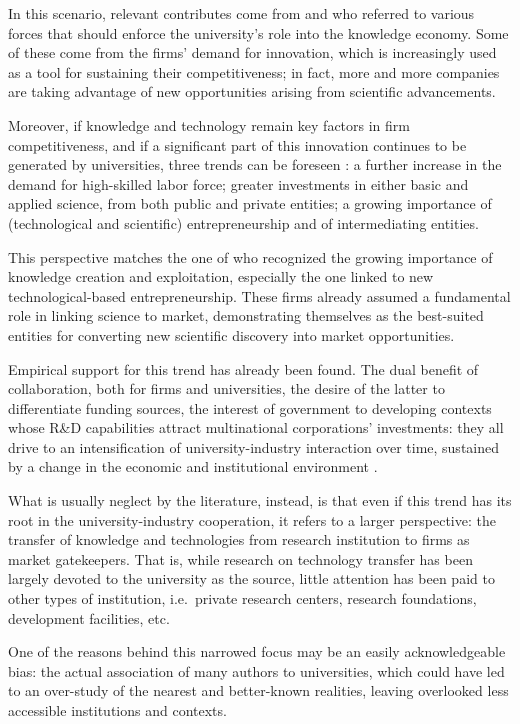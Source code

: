In this scenario, relevant contributes come from \citet{OShea2004} and \citet{Yusuf2008} who referred to various forces that should enforce the university's role into the knowledge economy. Some of these come from the firms' demand for innovation, which is increasingly used as a tool for sustaining their competitiveness; in fact, more and more companies are taking advantage of new opportunities arising from scientific advancements. 

Moreover, if knowledge and technology remain key factors in firm competitiveness, and if a significant part of this innovation continues to be generated by universities, three trends can be foreseen \citep{Yusuf2008}: a further increase in the demand for high-skilled labor force; greater investments in either basic and applied science, from both public and private entities; a growing importance of (technological and scientific) entrepreneurship and of intermediating entities. 

This perspective matches the one of \citet{OShea2004} who recognized the growing importance of knowledge creation and exploitation, especially the one linked to new technological-based entrepreneurship. These firms already assumed a fundamental role in linking science to market, demonstrating themselves as the best-suited entities for converting new scientific discovery into market opportunities. 

Empirical support for this trend has already been found. The dual benefit of collaboration, both for firms and universities, the desire of the latter to differentiate funding sources, the interest of government to developing contexts whose R\&D capabilities attract multinational corporations' investments: they all drive to an intensification of university-industry interaction over time, sustained by a change in the economic and institutional environment \citep{Debackere2005}.

What is usually neglect by the literature, instead, is that even if this trend has its root in the university-industry cooperation, it refers to a larger perspective: the transfer of knowledge and technologies from research institution to firms as market gatekeepers. That is, while research on technology transfer has been largely devoted to the university as the source, little attention has been paid to other types of institution, i.e.\ private research centers, research foundations, development facilities, etc.

One of the reasons behind this narrowed focus may be an easily acknowledgeable bias: the actual association of many authors to universities, which could have led to an over-study of the nearest and better-known realities, leaving overlooked less accessible institutions and contexts.

